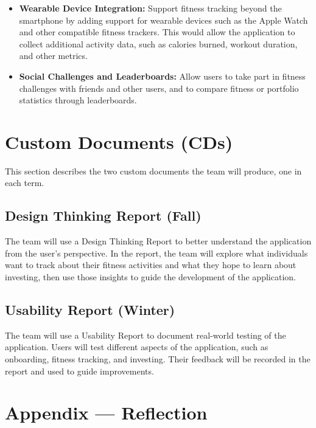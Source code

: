 \documentclass{article}
\begin{document}
\begin{itemize}
    \item \textbf{Wearable Device Integration:} Support fitness tracking beyond the smartphone by adding support for wearable devices 
    such as the Apple Watch and other compatible fitness trackers. 
    This would allow the application to collect additional activity data, 
    such as calories burned, workout duration, and other metrics.
    \item \textbf{Social Challenges and Leaderboards:} Allow users to take part in fitness challenges with friends and other users, 
    and to compare fitness or portfolio statistics through leaderboards.
\end{itemize}

\section{Custom Documents (CDs)}
This section describes the two custom documents the team will produce, one in each term.

\subsection{Design Thinking Report (Fall)}


The team will use a Design Thinking Report to better understand the application from the user's perspective. In the report, the team will explore what individuals want to track about their fitness activities and what they hope to learn about investing, then use those insights to guide the development of the application.


\subsection{Usability Report (Winter)}

The team will use a Usability Report to document real-world testing of the application. Users will test different aspects of the application, such as onboarding, fitness tracking, and investing. Their feedback will be recorded in the report and used to guide improvements.

\newpage{}

\section*{Appendix --- Reflection}

\end{document}
